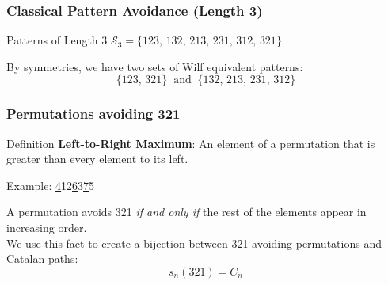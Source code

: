 \documentclass{beamer}  %
\begin{document}



\begin{frame}
\frametitle{Classical Pattern Avoidance (Length 3)}

\begin{block}{Patterns of Length 3}
  $\mathcal S_3=\{123,\,132,\,213,\,231,\,312,\,321\}$
\end{block}
\pause

By symmetries, we have two sets of Wilf equivalent patterns:
$$\{123,\,321\}\;\;\text{and}\;\;\{132,\,213,\,231,\,312\}$$

\end{frame}





\begin{frame}
\frametitle{Permutations avoiding 321}
\begin{block}{Definition}
    \textbf{Left-to-Right Maximum}: An element of a permutation that is greater than every element to its left.
\vspace{3mm}

    Example: \underline412\underline63\underline75
\end{block}
A permutation avoids 321 \textit{if and only if} the rest of the elements appear in increasing order.\\
\vspace{4mm}
We use this fact to create a bijection between 321 avoiding permutations and Catalan paths:
$$s_n(321)=C_n$$


    
\end{frame}

\end{document}
